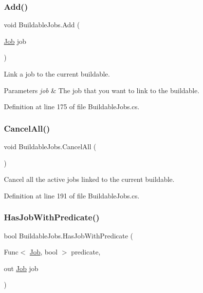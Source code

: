 \subsubsection{\texorpdfstring{Add()}{Add()}}
{\footnotesize\ttfamily void Buildable\+Jobs.\+Add (\begin{DoxyParamCaption}\item[{\hyperlink{class_job}{Job}}]{job }\end{DoxyParamCaption})}



Link a job to the current buildable. 


\begin{DoxyParams}{Parameters}
{\em job} & The job that you want to link to the buildable.\\
\hline
\end{DoxyParams}


Definition at line 175 of file Buildable\+Jobs.\+cs.

\mbox{\label{class_buildable_jobs_aa314a2e1dfe5543a5ae6d467dd24d9f2}} 
\subsubsection{\texorpdfstring{Cancel\+All()}{CancelAll()}}
{\footnotesize\ttfamily void Buildable\+Jobs.\+Cancel\+All (\begin{DoxyParamCaption}{ }\end{DoxyParamCaption})}



Cancel all the active jobs linked to the current buildable. 



Definition at line 191 of file Buildable\+Jobs.\+cs.

\mbox{\label{class_buildable_jobs_af90f2c51bf74125bd84ee3320b54ffe2}} 
\subsubsection{\texorpdfstring{Has\+Job\+With\+Predicate()}{HasJobWithPredicate()}}
{\footnotesize\ttfamily bool Buildable\+Jobs.\+Has\+Job\+With\+Predicate (\begin{DoxyParamCaption}\item[{Func$<$ \hyperlink{class_job}{Job}, bool $>$}]{predicate,  }\item[{out \hyperlink{class_job}{Job}}]{job }\end{DoxyParamCaption})}



